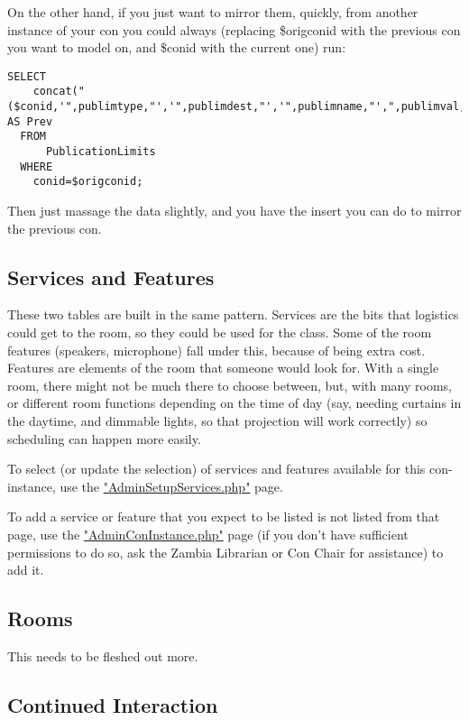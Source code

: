 \documentclass[captions=tablesignature]{scrartcl}
\begin{document}
On the other hand, if you just want to mirror them, quickly, from
another instance of your con you could always (replacing \$origconid
with the previous con you want to model on, and \$conid with the
current one) run:
\begin{verbatim}
SELECT
    concat("($conid,'",publimtype,"','",publimdest,"','",publimname,"',",publimval,",'",publimnote,"'),") AS Prev
  FROM
      PublicationLimits
  WHERE
    conid=$origconid;
\end{verbatim}
Then just massage the data slightly, and you have the insert you
can do to mirror the previous con.

\subsection{Services and Features}
\label{sec-13-2}

These two tables are built in the same pattern.  Services are the
bits that logistics could get to the room, so they could be used
for the class.  Some of the room features (speakers, microphone)
fall under this, because of being extra cost.  Features are
elements of the room that someone would look for.  With a single
room, there might not be much there to choose between, but, with
many rooms, or different room functions depending on the time of
day (say, needing curtains in the daytime, and dimmable lights, so
that projection will work correctly) so scheduling can happen more
easily.

To select (or update the selection) of services and features
available for this con-instance, use the \href{../webpages/AdminSetupServices.php}{"AdminSetupServices.php"}
page.

To add a service or feature that you expect to be listed is not
listed from that page, use the \href{../webpages/AdminConInstance.php}{"AdminConInstance.php"} page (if you
don't have sufficient permissions to do so, ask the Zambia
Librarian or Con Chair for assistance) to add it.
\subsection{Rooms}
\label{sec-13-3}

This needs to be fleshed out more.

\subsection{Continued Interaction}
\label{sec-13-4}
\end{document}
